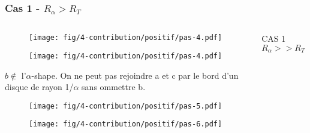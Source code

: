 \begin{frame}
  \frametitle{Cas 1 - $R_{\alpha} > R_T$}
\begin{columns}[t]
    \begin{column}{7cm}
      {
        \begin{figure}[h!]
          \centering
          \texttt{[image: fig/4-contribution/positif/pas-4.pdf]}
        \end{figure}
      }
      {
        \begin{figure}[h!]
          \centering
          \texttt{[image: fig/4-contribution/positif/pas-4.pdf]}
        \end{figure}
      
        \begin{block}{$b \notin$ l'$\alpha$-shape.}
          On ne peut pas rejoindre a et c par le bord d'un disque de rayon 1/$\alpha$ sans ommettre b.
        \end{block}
      }
      {
        \begin{figure}[h!]
          \centering
          \texttt{[image: fig/4-contribution/positif/pas-5.pdf]}
        \end{figure}
      }
      {
        \begin{figure}[h!]
          \centering
          \texttt{[image: fig/4-contribution/positif/pas-6.pdf]}
        \end{figure}
      }
    \end{column}
    \begin{column}{3cm}
      \begin{block}{}
        {
          \alert{CAS 1}
          \alert{$R_{\alpha} >> R_T$}\\

}
\end{block}
\end{column}
\end{columns}
\end{frame}
